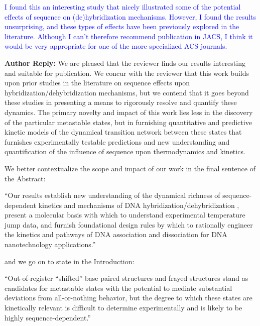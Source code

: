 \documentclass[11pt,a4paper]{letter} %
\newcommand*{\rood}[1]{{\color{red}{#1}}}
\begin{document}
\textcolor{blue}{I found this an interesting study that nicely illustrated some of the potential effects of sequence on (de)hybridization mechanisms. However, I found the results unsurprising, and these types of effects have been previously explored in the literature. Although I can't therefore recommend publication in JACS, I think it would be very appropriate for one of the more specialized ACS journals.}

\textbf{Author Reply:}  We are pleased that the reviewer finds our results interesting and suitable for publication. We concur with the reviewer that this work builds upon prior studies in the literature on sequence effects upon hybridization/dehybridization mechanisms, but we contend that it goes beyond these studies in presenting a means to rigorously resolve and quantify these dynamics. The primary novelty and impact of this work lies less in the discovery of the particular metastable states, but in furnishing quantitative and predictive kinetic models of the dynamical transition network between these states that furnishes experimentally testable predictions and new understanding and quantification of the influence of sequence upon thermodynamics and kinetics.

We better contextualize the scope and impact of our work in the final sentence of the Abstract:

``Our results establish new understanding of the dynamical richness of sequence-dependent kinetics and mechanisms of DNA hybridization/dehybridization \rood{by furnishing quantitative and predictive kinetic models of the dynamical transition network between metastable states}, present a molecular basis with which to understand experimental temperature jump data, and furnish foundational design rules by which to rationally engineer the kinetics and pathways of DNA association and dissociation for DNA nanotechnology applications.''

and we go on to state in the Introduction:

``Out-of-register ``shifted'' base paired structures \citep{Flamm2000RNAResolution, Romano2013DNADependence, Hinckley2014Coarse-grainedEffects, Maciejczyk2014DNAModel, Araque2016LatticeCooperativity, Xiao2019} and frayed structures \citep{Zgarbova2014BaseRNA, Nonin1995TerminalFraying, Nikolova2012ProbingSimulations, Andreatta2006UltrafastHelix} stand as candidates for metastable states with the potential to mediate substantial deviations from all-or-nothing behavior, but the degree to which these states are kinetically relevant is difficult to determine experimentally and is likely to be highly sequence-dependent.''
\end{document}
